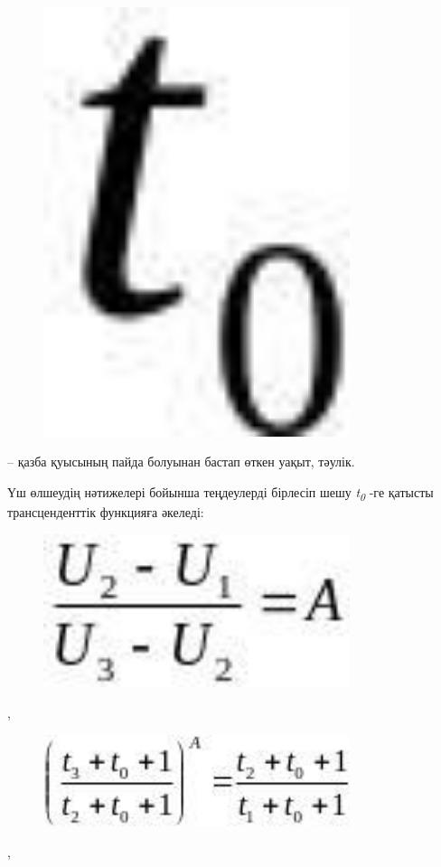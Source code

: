 \begin{figure}[H]
	\centering
	\includegraphics[width=0.8\textwidth]{assets/1307}
	\caption*{}
\end{figure} -- қазба қуысының пайда болуынан
бастап өткен уақыт, тәулік.

Үш өлшеудің нәтижелері бойынша теңдеулерді бірлесіп шешу
\emph{t\textsubscript{0 }}-ге қатысты трансценденттік функцияға әкеледі:

\begin{figure}[H]
	\centering
	\includegraphics[width=0.8\textwidth]{assets/1308}
	\caption*{}
\end{figure},
\begin{figure}[H]
	\centering
	\includegraphics[width=0.8\textwidth]{assets/1309}
	\caption*{}
\end{figure},

